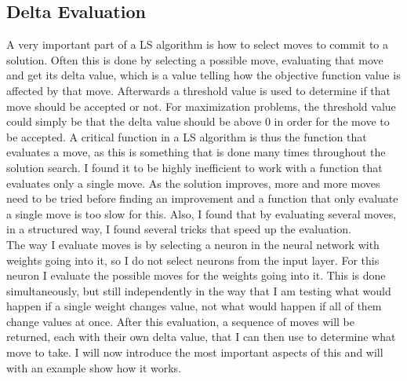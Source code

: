 \subsection{Delta Evaluation}
A very important part of a LS algorithm is how to select moves to commit to a solution. Often this is done by selecting a possible move, evaluating that move and get its delta value, which is a value telling how the objective function value is affected by that move. Afterwards a threshold value is used to determine if that move should be accepted or not. For maximization problems, the threshold value could simply be that the delta value should be above 0 in order for the move to be accepted. A critical function in a LS algorithm is thus the function that evaluates a move, as this is something that is done many times throughout the solution search. I found it to be highly inefficient to work with a function that evaluates only a single move. As the solution improves, more and more moves need to be tried before finding an improvement and a function that only evaluate a single move is too slow for this. Also, I found that by evaluating several moves, in a structured way, I found several tricks that speed up the evaluation. \\

The way I evaluate moves is by selecting a neuron in the neural network with weights going into it, so I do not select neurons from the input layer. For this neuron I evaluate the possible moves for the weights going into it. This is done simultaneously, but still independently in the way that I am testing what would happen if a single weight changes value, not what would happen if all of them change values at once. After this evaluation, a sequence of moves will be returned, each with their own delta value, that I can then use to determine what move to take. I will now introduce the most important aspects of this and will with an example show how it works. 

